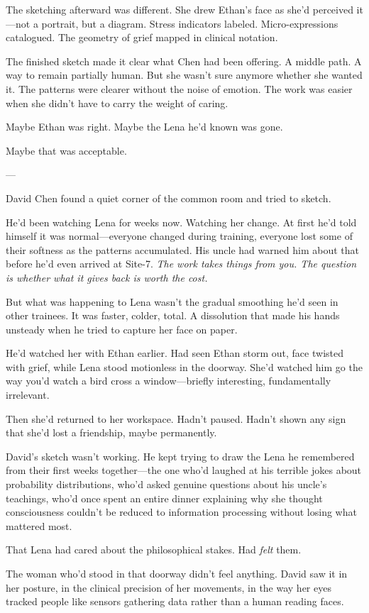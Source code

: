 The sketching afterward was different. She drew Ethan's face as she'd perceived it—not a portrait, but a diagram. Stress indicators labeled. Micro-expressions catalogued. The geometry of grief mapped in clinical notation.

The finished sketch made it clear what Chen had been offering. A middle path. A way to remain partially human. But she wasn't sure anymore whether she wanted it. The patterns were clearer without the noise of emotion. The work was easier when she didn't have to carry the weight of caring.

Maybe Ethan was right. Maybe the Lena he'd known was gone.

Maybe that was acceptable.

---

David Chen found a quiet corner of the common room and tried to sketch.

He'd been watching Lena for weeks now. Watching her change. At first he'd told himself it was normal—everyone changed during training, everyone lost some of their softness as the patterns accumulated. His uncle had warned him about that before he'd even arrived at Site-7. \textit{The work takes things from you. The question is whether what it gives back is worth the cost.}

But what was happening to Lena wasn't the gradual smoothing he'd seen in other trainees. It was faster, colder, total. A dissolution that made his hands unsteady when he tried to capture her face on paper.

He'd watched her with Ethan earlier. Had seen Ethan storm out, face twisted with grief, while Lena stood motionless in the doorway. She'd watched him go the way you'd watch a bird cross a window—briefly interesting, fundamentally irrelevant.

Then she'd returned to her workspace. Hadn't paused. Hadn't shown any sign that she'd lost a friendship, maybe permanently.

David's sketch wasn't working. He kept trying to draw the Lena he remembered from their first weeks together—the one who'd laughed at his terrible jokes about probability distributions, who'd asked genuine questions about his uncle's teachings, who'd once spent an entire dinner explaining why she thought consciousness couldn't be reduced to information processing without losing what mattered most.

That Lena had cared about the philosophical stakes. Had \textit{felt} them.

The woman who'd stood in that doorway didn't feel anything. David saw it in her posture, in the clinical precision of her movements, in the way her eyes tracked people like sensors gathering data rather than a human reading faces.

